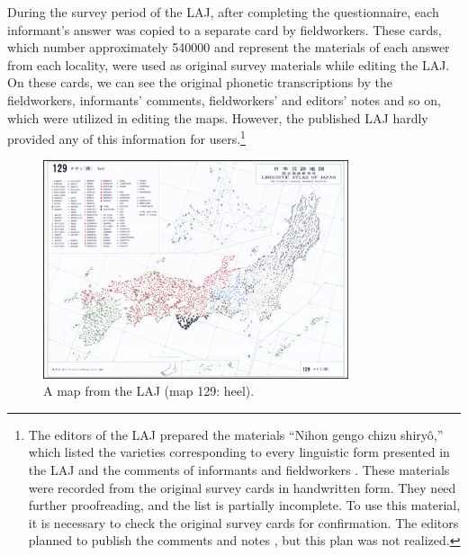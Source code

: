 \documentclass[output=paper]{LSP/langsci}
\begin{document}
During the survey period of the LAJ, after completing the questionnaire, each informant’s answer was copied to a separate card by fieldworkers. These cards, which number approximately 540000 \citep[38, 43]{kokuritsu_kokugo_kenkyujo_nlri_nihon_1966} and represent the materials of each answer from each locality, were used as original survey materials while editing the LAJ. On these cards, we can see the original phonetic transcriptions by the fieldworkers, informants’ comments, fieldworkers’ and editors’ notes and so on, which were utilized in editing the maps. However, the published LAJ hardly provided any of this information for users.\footnote{The editors of the LAJ prepared the materials “Nihon gengo chizu shiryô,” which listed the varieties corresponding to every linguistic form presented in the LAJ and the comments of informants and fieldworkers \citep[32, 33]{kokuritsu_kokugo_kenkyujo_nlri_nihon_1966}. These materials were recorded from the original survey cards in handwritten form. They need further proofreading, and the list is partially incomplete. To use this material, it is necessary to check the original survey cards for confirmation. The editors planned to publish the comments and notes \citep[44]{kokuritsu_kokugo_kenkyujo_nlri_nihon_1966}, but this plan was not realized.}

\begin{figure}
\includegraphics[width=0.8\textwidth]{illustrations/kuma_fig01}
\caption{A map from the LAJ (map 129: heel).}          
\label{fig:1}
\end{figure}  
\end{document}
